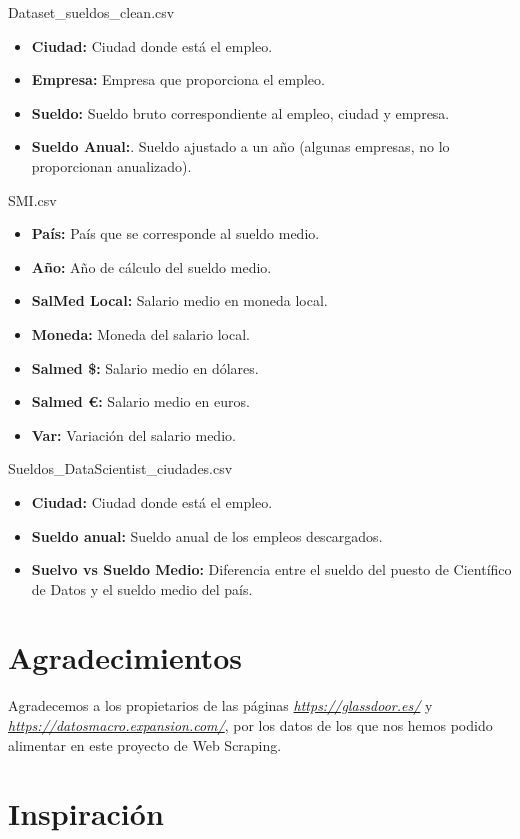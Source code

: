 \documentclass[IB]{PlantillaPACnova_Est}
\begin{document}
Dataset\_sueldos\_clean.csv
\begin{itemize}
\item \textbf{Ciudad: } Ciudad donde está el empleo.
\item \textbf{Empresa:} Empresa que proporciona el empleo.
\item \textbf{Sueldo:} Sueldo bruto correspondiente al empleo, ciudad y empresa.
\item \textbf{Sueldo Anual:}. Sueldo ajustado a un año (algunas empresas, no lo proporcionan anualizado).
\end{itemize}

SMI.csv
\begin{itemize}
\item \textbf{País: }País que se corresponde al sueldo medio.
\item \textbf{Año: }Año de cálculo del sueldo medio.
\item \textbf{SalMed Local: }Salario medio en moneda local.
\item \textbf{Moneda:} Moneda del salario local.
\item \textbf{Salmed \$:} Salario medio en dólares.
\item \textbf{Salmed €:} Salario medio en euros.
\item \textbf{Var:} Variación del salario medio.
\end{itemize}

Sueldos\_DataScientist\_ciudades.csv
\begin{itemize}
\item \textbf{Ciudad:}  Ciudad donde está el empleo.
\item \textbf{Sueldo anual:} Sueldo anual de los empleos descargados.
\item \textbf{Suelvo vs Sueldo Medio: }Diferencia entre el sueldo del puesto de Científico de Datos y el sueldo medio del país.
\end{itemize}

\section{Agradecimientos}

Agradecemos a los propietarios de las páginas  \textit{\url{https://glassdoor.es/}} y \textit{ \url{https://datosmacro.expansion.com/}}, por los datos de los que nos hemos podido alimentar en este proyecto de Web Scraping. 

\section{Inspiración}
\end{document}
